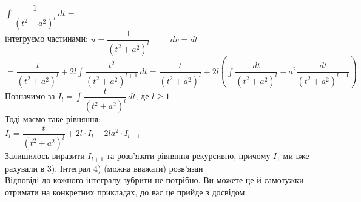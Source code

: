 \documentclass[a4paper, 14pt]{extarticle}
\def\huge{\displaystyle}
\def\bigline{\vspace{5mm}\\}
\theoremstyle{theoremdd}
\theoremstyle{theoremdd}
\theoremstyle{theoremdd}
\theoremstyle{theoremdd}
\theoremstyle{theoremdd}
\theoremstyle{theoremdd}
\theoremstyle{theoremdd}
\theoremstyle{theoremdd}
\begin{document}
$\huge \int \dfrac{1}{(t^2+a^2)^l}\,dt \boxed{=}$ \\ інтегруємо частинами:
$u = \dfrac{1}{(t^2+a^2)^l} \hspace{1cm} dv = dt$\\
$\boxed{=} \huge \dfrac{t}{(t^2+a^2)^l} + 2l \int \dfrac{t^2}{(t^2+a^2)^{l+1}}\,dt = \dfrac{t}{(t^2+a^2)^l} + 2l \left(\int \dfrac{dt}{(t^2+a^2)^l} - a^2 \dfrac{dt}{(t^2+a^2)^{l+1}} \right)$\\
Позначимо за $I_l = \huge \int \dfrac{t}{(t^2+a^2)^l}\,dt$, де $l \geq 1$\\
Тоді маємо таке рівняння:\\
$I_l = \dfrac{t}{(t^2+a^2)^l} + 2l \cdot I_l - 2la^2 \cdot I_{l+1}$\\
Залишилось виразити $I_{l+1}$ та розв'язати рівняння рекурсивно, причому $I_1$ ми вже рахували в 3). Інтеграл 4) (можна вважати) розв'язан
\bigline
Відповіді до кожного інтегралу зубрити не потрібно. Ви можете це й самотужки отримати на конкретних прикладах, до вас це прийде з досвідом
\end{document}
